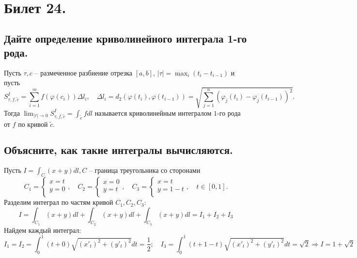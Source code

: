 \section{Билет 24.}

\subsection{Дайте определение криволинейного интеграла 1-го рода.}
\begin{definition}
    Пусть $\tau, c$ -- размеченное разбиение отрезка $[a,b]$, $|\tau| = \max_{i} (t_i - t_{i-1})$ и
    пусть
    \[
        S_{\tau, f, \tilde{c}}^{I} = \sum_{i=1}^{m} f(\varphi(c_i)) \Delta l_i,
        \quad
        \Delta l_i = d_2 (\varphi (t_i), \varphi (t_{i-1})) = \sqrt{
            \sum_{j=1}^n (
                \varphi_j(t_i) - \varphi_j(t_{i-1})
            )^2
        }.
    \]
    Тогда $\lim_{|\tau| \to 0} S_{\tau, f, \tilde{c}}^I = \int_{\tilde{c}} f dl$ называется криволинейным интегралом $1$-го рода от $f$ по кривой $\tilde{c}$.
\end{definition}

\subsection{Объясните, как такие интегралы вычисляются.}
Пусть $I = \int_C (x + y) dl, C$ -- граница треугольника со сторонами
\[
    C_1 = \begin{cases}
        x = t \\
        y = 0 \\
    \end{cases},
    \quad
    C_2 = \begin{cases}
        x = 0 \\
        y = t \\
    \end{cases},
    \quad
    C_3 = \begin{cases}
        x = t \\
        y = 1-t \\
    \end{cases},
    \quad
    t \in [0, 1].
\]
Разделим интеграл по частям кривой $C_1, C_2, C_3$:
\[
    I = \int_{C_1} (x + y) dl + \int_{C_2} (x + y) dl + \int_{C_3} (x + y) dl = I_1 + I_2 + I_3
\]
Найдем каждый интеграл:
\[
    I_1 = I_2 = \int_{0}^{1} (t + 0) \sqrt{(x'_t)^2 + (y'_t)^2} dt = \frac{1}{2};
    \quad
    I_3 = \int_{0}^{1} (t + 1 - t) \sqrt{(x'_t)^2 + (y'_t)^2} dt = \sqrt{2}
    \Rightarrow
    I = 1 + \sqrt{2}
\]